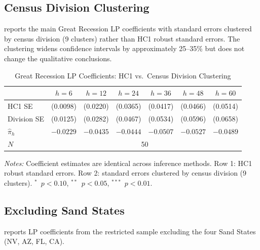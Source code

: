 \documentclass[12pt]{article}
\begin{document}
\subsection{Census Division Clustering}

 reports the main Great Recession LP coefficients with standard errors clustered by census division (9 clusters) rather than HC1 robust standard errors. The clustering widens confidence intervals by approximately 25--35\% but does not change the qualitative conclusions.

\begin{table}[H]
\centering
\caption{Great Recession LP Coefficients: HC1 vs.\ Census Division Clustering}
\label{tab:app_cluster}
\begin{threeparttable}
\small
\begin{tabular}{lcccccc}
\toprule
& $h=6$ & $h=12$ & $h=24$ & $h=36$ & $h=48$ & $h=60$ \\
\midrule
HC1 SE & (0.0098) & (0.0220) & (0.0365) & (0.0417) & (0.0466) & (0.0514) \\
Division SE & (0.0125) & (0.0282) & (0.0467) & (0.0534) & (0.0596) & (0.0658) \\
\midrule
$\hat{\pi}_h$ & $-0.0229$ & $-0.0435$ & $-0.0444$ & $-0.0507$ & $-0.0527$ & $-0.0489$ \\
\midrule
$N$ & \multicolumn{6}{c}{50} \\
\bottomrule
\end{tabular}
\begin{tablenotes}[flushleft]
\small
\item \textit{Notes:} Coefficient estimates are identical across inference methods. Row 1: HC1 robust standard errors. Row 2: standard errors clustered by census division (9 clusters). $^{*}$~$p<0.10$, $^{**}$~$p<0.05$, $^{***}$~$p<0.01$.
\end{tablenotes}
\end{threeparttable}
\end{table}

\subsection{Excluding Sand States}

 reports LP coefficients from the restricted sample excluding the four Sand States (NV, AZ, FL, CA).
\end{document}
